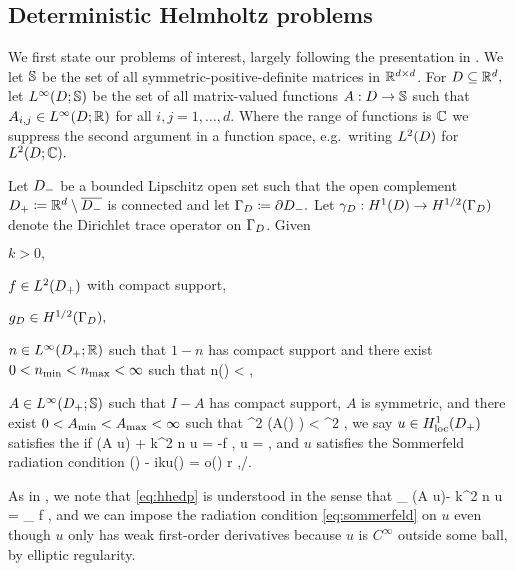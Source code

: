 \subsection{Deterministic Helmholtz problems}\label{sec:detprobs}

We first state our problems of interest, largely following the presentation in \cite{GrPeSp:19}. We let $\mathbb S$ be the set of all symmetric-positive-definite matrices in $\mathbb R^{d\times d}$. For $D \subseteq \mathbb R^{d},$ let $\LiDRRdtd$ be the set of all matrix-valued functions $A:D\rightarrow\mathbb S$ such that $A_{i,j} \in \LiDRR$ for all $i,j =   1,\ldots,d.$ Where the range of functions is $\mathbb C$ we suppress the second argument in a function space, e.g.~writing $\LtD$ for $\LtDCC.$

  \label{prob:edp}
  Let $D_{-}$ be a bounded Lipschitz open set such that the open complement $D_{+} \coloneqq \mathbb R^{d} \setminus \overline{D_{-}}$ is connected and let $\Gamma_{D} \coloneqq \partial D_{-}.$ Let $\trD:\HoD\rightarrow\HhGD$ denote the Dirichlet trace operator on $\Gamma_{D}$. Given
  \bit
  \item $k > 0,$
\item $f \in \LtDp$ with compact support,
\item $\gD \in \HhGD,$
\item $n \in \LiDpRR$ such that $1-n$ has compact support and there exist $0 < n_{\min} < n_{\max} < \infty$ such that
  \beq\label{eq:nbounds}
\nmin \leq n(\bx) < \nmax \tfae \bx \in \Dp,
  \eeq
\item $A \in \LiDpRRdtd$ such that $I-A$ has compact support, $A$ is symmetric, and there exist $0 < A_{\min} < A_{\max} < \infty$ such that
  \beq\label{eq:Abounds}
\Amin \abs{\bxi}^2 \leq \mleft(A(\bx) \bxi \mright) \cdot \bxibar < \Amax \abs{\bxi}^2 \tfa \bxi \in \CCd \tfae \bx \in \Dp,
  \eeq
  \eit
  we say $u \in \HolocDp$ satisfies the  if
  \beq\label{eq:hhedp}
\grad \cdot \mleft(A \grad u\mright) + k^2 n u = -f \tin \Dp,
\eeq
\beq\label{eq:dbc}
\trGD u = \gD,
\eeq
and $u$ satisfies the Sommerfeld radiation condition
\beq\label{eq:sommerfeld}
\dudr(\bx) - iku(\bx) = o\mleft(\mright) r \de \abs{\bx} \rightarrow \infty,\bxhat \de \bx/\abs{\bx}.
\eeq
\eprob

As in \cite[pp. 2874-2875]{GrPeSp:19}, we note that \cref{eq:hhedp} is understood in the sense that
\beqs
\int_{\Dp} \mleft(A \grad u\mright)\cdot \grad \phibar - k^2 n u \phibar = \int_{\Dp} f \phibar {} \phi \in \CzinftyDp,
\eeqs
and we can impose the radiation condition \cref{eq:sommerfeld} on $u$ even though $u$ only has weak first-order derivatives because $u$ is $C^\infty$ outside some ball, by elliptic regularity.

